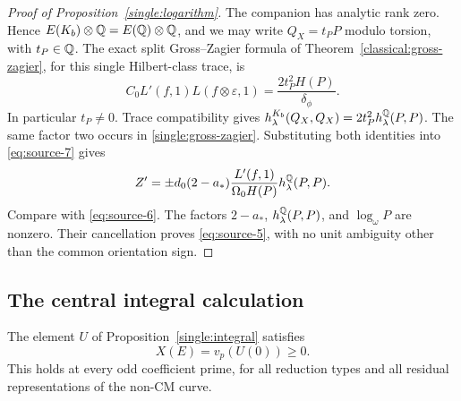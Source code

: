 \begin{proof}[Proof of Proposition~\ref{single:logarithm}]
The companion has analytic rank zero.  Hence
\(E(K_b)\otimes\mathbb Q=E(\mathbb Q)\otimes\mathbb Q\), and we may write
\(Q_X=t_PP\) modulo torsion, with \(t_P\in\mathbb Q\).  The exact
split Gross--Zagier formula of Theorem~\ref{classical:gross-zagier}, for
this single Hilbert-class trace, is
\begin{equation}\label{single:gross-zagier}
 C_0L'(f,1)L(f\otimes\varepsilon,1)
                     =\frac{2t_P^2H(P)}{\delta_\phi}.
\end{equation}
In particular \(t_P\ne0\).  Trace compatibility gives
\(h_\lambda^{K_b}(Q_X,Q_X)=2t_P^2h_\lambda^\mathbb Q(P,P)\).
The same factor two occurs in \eqref{single:gross-zagier}.
Substituting both identities into \eqref{eq:source-7} gives
\[
 Z'=\pm d_0(2-a_*)\frac{L'(f,1)}{\Omega_0H(P)}
                                      h_\lambda^\mathbb Q(P,P).
\]
Compare with \eqref{eq:source-6}.  The factors
\(2-a_*\), \(h_\lambda^\mathbb Q(P,P)\), and \(\log_\omega P\)
are nonzero.  Their cancellation proves
\eqref{eq:source-5}, with no unit ambiguity other than the
common orientation sign.
\end{proof}

\subsection{The central integral calculation}

\begin{proposition}\label{single:center}
The element \(U\) of Proposition~\ref{single:integral} satisfies
\begin{equation}
                         X(E)=v_p(U(0))\ge0.
                         \tag{8}\label{eq:source-8}
\end{equation}
This holds at every odd coefficient prime, for all reduction
types and all residual representations of the non-CM curve.
\end{proposition}

